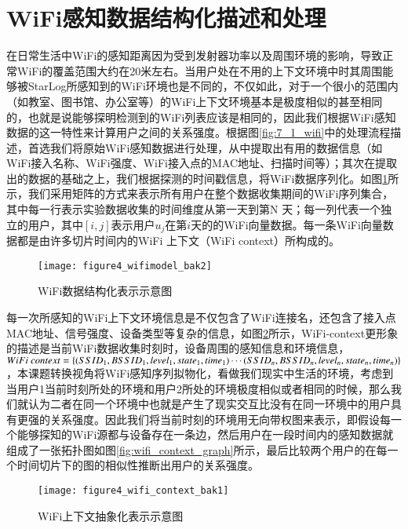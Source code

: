 \section{WiFi感知数据结构化描述和处理}
\label{wifi_pro_tec}
在日常生活中WiFi的感知距离因为受到发射器功率以及周围环境的影响，导致正常WiFi的覆盖范围大约在20米左右。当用户处在不用的上下文环境中时其周围能够被StarLog所感知到的WiFi环境也是不同的，不仅如此，对于一个很小的范围内（如教室、图书馆、办公室等）的WiFi上下文环境基本是极度相似的甚至相同的，也就是说能够探明检测到的WiFi列表应该是相同的，因此我们根据WiFi感知数据的这一特性来计算用户之间的关系强度。根据图\ref{fig:7_1_wifi}中的处理流程描述，首选我们将原始WiFi感知数据进行处理，从中提取出有用的数据信息（如WiFi接入名称、WiFi强度、WiFi接入点的MAC地址、扫描时间等）；其次在提取出的数据的基础之上，我们根据探测的时间戳信息，将WiFi数据序列化。如图\ref{fig:wifimodel_process}所示，我们采用矩阵的方式来表示所有用户在整个数据收集期间的WiFi序列集合，其中每一行表示实验数据收集的时间维度从第一天到第N 天；每一列代表一个独立的用户，其中$[i,j]$表示用户$u_{j}$在第$i$天的的WiFi向量数据。每一条WiFi向量数据都是由许多切片时间内的WiFi 上下文（WiFi context）所构成的。
\begin{figure}[htp]
\centering
\texttt{[image: figure4\_wifimodel\_bak2]}
\caption{WiFi数据结构化表示示意图}
\label{fig:wifimodel_process}
\end{figure}
\par 每一次所感知的WiFi上下文环境信息是不仅包含了WiFi连接名，还包含了接入点MAC地址、信号强度、设备类型等复杂的信息，如图\ref{fig:wifi_context}所示，WiFi-context更形象的描述是当前WiFi数据收集时刻时，设备周围的感知信息和环境信息， $WiFi \ context= \{ (SSID_{1},BSSID_{1},level_{1},state_{1},time_{1}) \cdots  (SSID_{n},BSSID_{n},level_{n}, \\ state_{n},time_{n}) \}$，本课题转换视角将WiFi感知序列拟物化，看做我们现实中生活的环境，考虑到当用户1当前时刻所处的环境和用户2所处的环境极度相似或者相同的时候，那么我们就认为二者在同一个环境中也就是产生了现实交互比没有在同一环境中的用户具有更强的关系强度。因此我们将当前时刻的环境用无向带权图来表示，即假设每一个能够探知的WiFi源都与设备存在一条边，然后用户在一段时间内的感知数据就组成了一张拓扑图如图\ref{fig:wifi_context_graph}所示，最后比较两个用户的在每一个时间切片下的图的相似性推断出用户的关系强度。
\begin{figure}[htp]
\centering
\texttt{[image: figure4\_wifi\_context\_bak1]}
\caption{WiFi上下文抽象化表示示意图}
\label{fig:wifi_context}
\end{figure}

